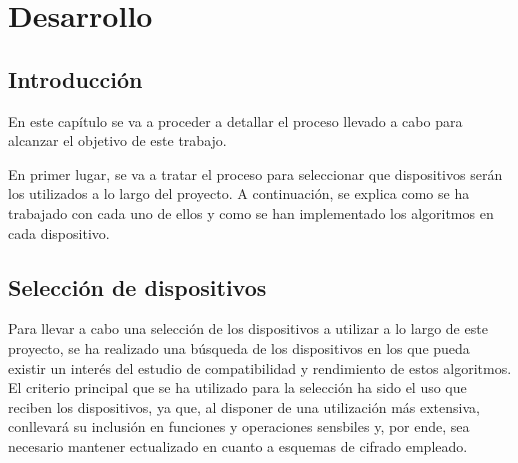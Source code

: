 %
%
%
% 
%
%
%
%

\chapter{Desarrollo}\label{cha:desarrollo}

\section{Introducción}\label{sec:introduccion-desarrollo}

En este capítulo se va a proceder a detallar el proceso llevado a cabo para alcanzar el objetivo de este trabajo.

En primer lugar, se va a tratar el proceso para seleccionar que dispositivos serán los utilizados a lo largo del proyecto.
A continuación, se explica como se ha trabajado con cada uno de ellos y como se han implementado los algoritmos en cada dispositivo.


\section{Selección de dispositivos}\label{sec:sel-disp}

Para llevar a cabo una selección de los dispositivos a utilizar a lo largo de este proyecto, se ha realizado una búsqueda de los dispositivos en los que pueda existir un interés del estudio de compatibilidad y rendimiento de estos algoritmos.
El criterio principal que se ha utilizado para la selección ha sido el uso que reciben los dispositivos, ya que, al disponer de una utilización más extensiva, conllevará su inclusión en funciones y operaciones sensbiles y, por ende, sea necesario mantener ectualizado en cuanto a esquemas de cifrado empleado.

